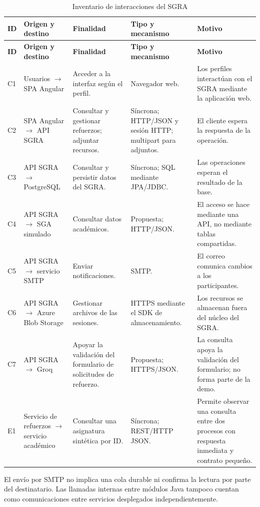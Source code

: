\begingroup
\small
\begin{longtable}{@{}p{}p{}p{}p{}p{}@{}}
\caption{Inventario de interacciones del SGRA}\label{tab:inventario-interacciones}\\
\toprule
\textbf{ID}&\textbf{Origen y destino}&\textbf{Finalidad}&\textbf{Tipo y mecanismo}&\textbf{Motivo}\\\midrule\endfirsthead
\toprule
\textbf{ID}&\textbf{Origen y destino}&\textbf{Finalidad}&\textbf{Tipo y mecanismo}&\textbf{Motivo}\\\midrule\endhead
C1 & Usuarios $\rightarrow$ SPA Angular & Acceder a la interfaz según el perfil. & Navegador web. & Los perfiles interactúan con el SGRA mediante la aplicación web.\\
C2 & SPA Angular $\rightarrow$ API SGRA & Consultar y gestionar refuerzos; adjuntar recursos. & Síncrona; HTTP/JSON y sesión HTTP; multipart para adjuntos. & El cliente espera la respuesta de la operación.\\
C3 & API SGRA $\rightarrow$ PostgreSQL & Consultar y persistir datos del SGRA. & Síncrona; SQL mediante JPA/JDBC. & Las operaciones esperan el resultado de la base.\\
C4 & API SGRA $\rightarrow$ SGA simulado & Consultar datos académicos. & Propuesta; HTTP/JSON. & El acceso se hace mediante una API, no mediante tablas compartidas.\\
C5 & API SGRA $\rightarrow$ servicio SMTP & Enviar notificaciones. & SMTP. & El correo comunica cambios a los participantes.\\
C6 & API SGRA $\rightarrow$ Azure Blob Storage & Gestionar archivos de las sesiones. & HTTPS mediante el SDK de almacenamiento. & Los recursos se almacenan fuera del núcleo del SGRA.\\
C7 & API SGRA $\rightarrow$ Groq & Apoyar la validación del formulario de solicitudes de refuerzo. & Propuesta; HTTPS/JSON. & La consulta apoya la validación del formulario; no forma parte de la demo.\\
E1 & Servicio de refuerzos $\rightarrow$ servicio académico & Consultar una asignatura sintética por ID. & Síncrona; REST/HTTP JSON. & Permite observar una consulta entre dos procesos con respuesta inmediata y contrato pequeño.\\
\bottomrule
\end{longtable}
\endgroup

El envío por SMTP no implica una cola durable ni confirma la lectura por parte del destinatario. Las llamadas internas entre módulos Java tampoco cuentan como comunicaciones entre servicios desplegados independientemente.

